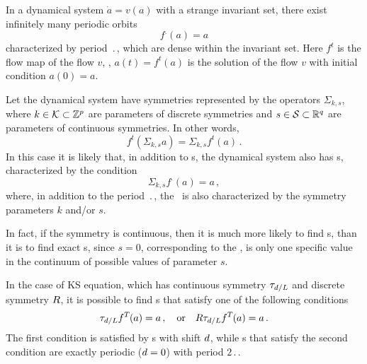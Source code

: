 \renewcommand{\inputfile}{\version\ - edited 2007-03-11 symRLD}



In a dynamical system $\dot{a} = v(a)$ with a strange invariant set, there exist
infinitely many periodic orbits
\[ f^\period{}(a) = a \]
characterized by period $\period{}$, which are dense within the invariant set.
Here $f^t$ is the flow map of the flow $v$, \ie, $a(t) = f^t(a)$ is the
solution of the flow $v$ with initial condition $a(0) = a$.

Let the dynamical system have symmetries represented by the operators
$\Sigma_{k,s}$, where $k \in {\cal K} \subset \mathbb{Z}^p$ are
parameters of discrete symmetries and $s \in {\cal S} \subset \mathbb{R}^q$
are parameters of continuous symmetries.  In other words,
\[ f^t(\Sigma_{k,s} a) = \Sigma_{k,s} f^t(a)\,. \]
In this case it is likely that, in addition to \po s, the dynamical system also
has \rpo s, characterized by the condition
\[ \Sigma_{k,s}f^\period{}(a) = a\,, \]
where, in addition to the period $\period{}$, the \rpo\ is also characterized by
the symmetry parameters $k$ and/or $s$.

In fact, if the symmetry is continuous, then it is much more likely
to find \rpo s, than it is to find exact \po s, since $s = 0$,
corresponding to the \po , is only one specific value in the
continuum of possible values of parameter $s$.

In the case of KS equation, which has continuous symmetry
$\tau_{d/L}$ and discrete symmetry $R$, it is possible to
find \rpo s that satisfy one of the following conditions
\[
  \tau_{d/L}f^{T_{}}(a) = a\,,
\quad\mbox{or}\quad
  R\tau_{d/L}f^{T_{}}(a) = a\,.
\]
The first condition is satisfied by \rpo s with shift $d$,
while \rpo s that satisfy the second condition are exactly periodic
($d = 0$) with period $2\period{}$.
